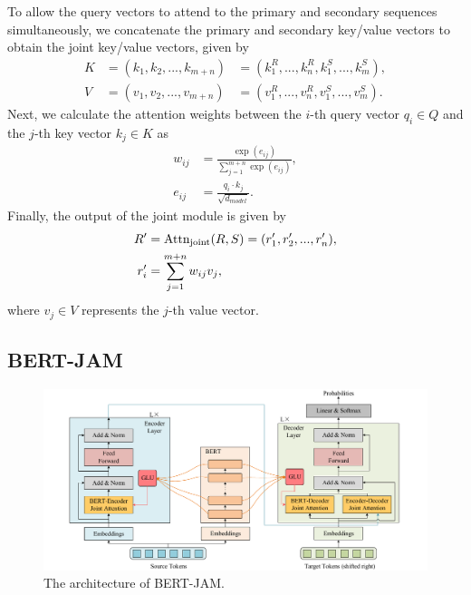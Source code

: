 \documentclass[review]{elsarticle}
\begin{document}
To allow the query vectors to attend to the primary and secondary sequences simultaneously, we concatenate the primary and secondary key/value vectors to obtain the joint key/value vectors, given by
\begin{equation}
    \label{eq:concat}
    \begin{aligned}
        K & = (k_1, k_2, ..., k_{m+n})&= (k_1^R, ..., k_n^R, k_1^S, ..., k_m^S), \\
        V & = (v_1, v_2, ..., v_{m+n})&= (v_1^R, ..., v_n^R, v_1^S, ..., v_m^S).
    \end{aligned}
\end{equation}
Next, we calculate the attention weights between the $i$-th query vector $q_i \in Q$ and the $j$-th key vector $k_j \in K$ as
\begin{equation}
    \label{eq:weights}
    \begin{aligned}
    w_{ij} & = \frac{\exp(e_{ij})}{\sum_{j=1}^{m+n} \exp(e_{ij})}, \\
    e_{ij} & = \frac{q_i \cdot k_j}{\sqrt{d_{model}}}.
    \end{aligned}
\end{equation}
Finally, the output of the joint module is given by
\begin{equation}
    \centering
    \label{eq:joint}
    \begin{aligned}
        R' &  =\text{Attn}_{\text{joint}}(R, S) = (r'_1, r'_2, ..., r'_n), \\
        r'_i & = \sum_{j=1}^{m+n} w_{ij} v_j,
    \end{aligned}
\end{equation}
where $v_j \in V$ represents the $j$-th value vector.


\subsection{BERT-JAM}
\label{ssec:bert-jam}

\begin{figure}[t]
    \centering
    \includegraphics[width=\textwidth]{arch}
    \caption{The architecture of BERT-JAM.}
    \label{fig:arch}
\end{figure}
\end{document}
